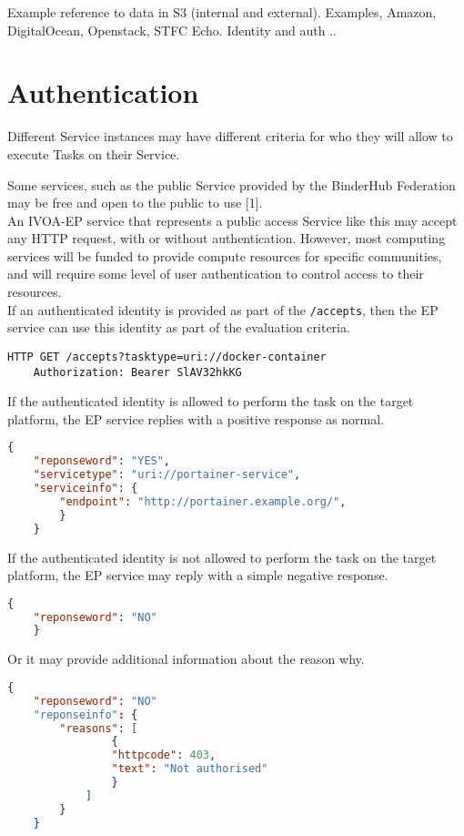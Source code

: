 \documentclass[11pt,a4paper]{ivoa}
\newcommand{\ivoep} {IVOA-EP\xspace}
\newcommand{\codeword}[1] {\texttt{#1}}
\begin{document}
Example reference to data in S3 (internal and external).
Examples, Amazon, DigitalOcean, Openstack, STFC Echo.
Identity and auth ..


\section{Authentication}
\label{sec:authentication}
Different Service instances may have different criteria for who they will allow to execute Tasks on their Service.

Some services, such as the public Service provided by the BinderHub Federation may be free and open to the public to use [1].
\\
An \ivoep service that represents a public access Service like this may accept any HTTP request, with or without authentication.
However, most computing services will be funded to provide compute resources for specific communities, and will require some level of user authentication to control access to their resources.
\\
If an authenticated identity is provided as part of the \codeword{/accepts}, then the EP service can use this identity as part of the evaluation criteria.
\begin{lstlisting}[]
    HTTP GET /accepts?tasktype=uri://docker-container
    Authorization: Bearer SlAV32hkKG
\end{lstlisting}

If the authenticated identity is allowed to perform the task on the target platform, the EP service replies with a positive
response as normal.
\begin{lstlisting}[language=json]
    {
    "reponseword": "YES",
    "servicetype": "uri://portainer-service",
    "serviceinfo": {
        "endpoint": "http://portainer.example.org/",
        }
    }
\end{lstlisting}

If the authenticated identity is not allowed to perform the task on the target platform, the EP service may
reply with a simple negative response.
\begin{lstlisting}[language=json]
    {
    "reponseword": "NO"
    }
\end{lstlisting}
Or it may provide additional information about the reason why.
\begin{lstlisting}[language=json]
    {
    "reponseword": "NO"
    "reponseinfo": {
        "reasons": [
                {
                "httpcode": 403,
                "text": "Not authorised"
                }
            ]
        }
    }
\end{lstlisting}
\end{document}
